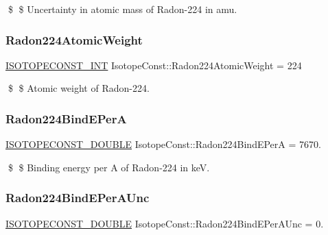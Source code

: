 \$ \$ Uncertainty in atomic mass of Radon-\/224 in amu. \mbox{\label{group___isotope_const-_radon-_rn224_gabebc509376c2696899d865a64b8c2c82}} 
\subsubsection{\texorpdfstring{Radon224\+Atomic\+Weight}{Radon224AtomicWeight}}
{\footnotesize\ttfamily \mbox{\hyperlink{group___isotope_const-_macros_ga5f18360b3e99483a35c32d789e62621c}{I\+S\+O\+T\+O\+P\+E\+C\+O\+N\+S\+T\+\_\+\+I\+NT}} Isotope\+Const\+::\+Radon224\+Atomic\+Weight = 224}

\$ \$ Atomic weight of Radon-\/224. \mbox{\label{group___isotope_const-_radon-_rn224_ga2b5072f66f8aea3baa366e68bea28885}} 
\subsubsection{\texorpdfstring{Radon224\+Bind\+E\+PerA}{Radon224BindEPerA}}
{\footnotesize\ttfamily \mbox{\hyperlink{group___isotope_const-_macros_ga8f45a7272ce02c0b4c65c44636ed719a}{I\+S\+O\+T\+O\+P\+E\+C\+O\+N\+S\+T\+\_\+\+D\+O\+U\+B\+LE}} Isotope\+Const\+::\+Radon224\+Bind\+E\+PerA = 7670.}

\$ \$ Binding energy per A of Radon-\/224 in keV. \mbox{\label{group___isotope_const-_radon-_rn224_ga79ac20681e11af6e7318d01de5d0c216}} 
\subsubsection{\texorpdfstring{Radon224\+Bind\+E\+Per\+A\+Unc}{Radon224BindEPerAUnc}}
{\footnotesize\ttfamily \mbox{\hyperlink{group___isotope_const-_macros_ga8f45a7272ce02c0b4c65c44636ed719a}{I\+S\+O\+T\+O\+P\+E\+C\+O\+N\+S\+T\+\_\+\+D\+O\+U\+B\+LE}} Isotope\+Const\+::\+Radon224\+Bind\+E\+Per\+A\+Unc = 0.}

